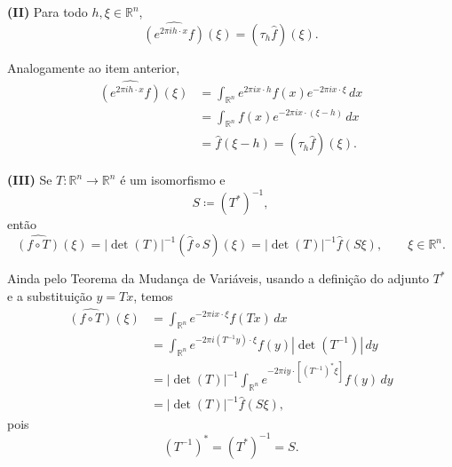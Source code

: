 \documentclass[../distribution_theory_notes.tex]{subfiles}
\begin{document}
\medskip
\noindent\textbf{(II)} Para todo $h,\xi\in\mathbb{R}^{n}$,
\[
	\widehat{\left(e^{2\pi i h\cdot x}f\right)}(\xi)
	=(\tau_{h}\widehat f)(\xi).
\]

\begin{proof*}
	Analogamente ao item anterior,
	\begin{align*}
		\widehat{\left(e^{2\pi i h\cdot x}f\right)}(\xi)
		 & =\int_{\mathbb{R}^{n}}e^{2\pi i x\cdot h}f(x)e^{-2\pi i x\cdot\xi}\,dx \\
		 & =\int_{\mathbb{R}^{n}}f(x)e^{-2\pi i x\cdot(\xi-h)}\,dx                \\
		 & =\widehat f(\xi-h)
		=(\tau_{h}\widehat f)(\xi).
	\end{align*}
	\qedsymbol
\end{proof*}

\medskip
\noindent\textbf{(III)} Se $T:\mathbb{R}^{n}\to\mathbb{R}^{n}$ é um isomorfismo e
\[
	S\coloneqq(T^{*})^{-1},
\]
então
\[
	\widehat{(f\circ T)}(\xi)
	=|\det(T)|^{-1}(\widehat f\circ S)(\xi)
	=|\det(T)|^{-1}\widehat f(S\xi),
	\qquad \xi\in\mathbb{R}^{n}.
\]

\begin{proof*}
	Ainda pelo Teorema da Mudança de Variáveis, usando a definição do adjunto $T^{*}$ e a substituição $y=Tx$, temos
	\begin{align*}
		\widehat{(f\circ T)}(\xi)
		 & =\int_{\mathbb{R}^{n}}e^{-2\pi i x\cdot\xi}f(Tx)\,dx \\
		 & =\int_{\mathbb{R}^{n}}
		e^{-2\pi i (T^{-1}y)\cdot\xi}f(y)|\det(T^{-1})|\,dy     \\
		 & =|\det(T)|^{-1}
		\int_{\mathbb{R}^{n}}
		e^{-2\pi i y\cdot[(T^{-1})^{*}\xi]}f(y)\,dy             \\
		 & =|\det(T)|^{-1}\widehat f(S\xi),
	\end{align*}
	pois
	\[
		(T^{-1})^{*}=(T^{*})^{-1}=S.
	\]
	\qedsymbol
\end{proof*}
\end{document}
